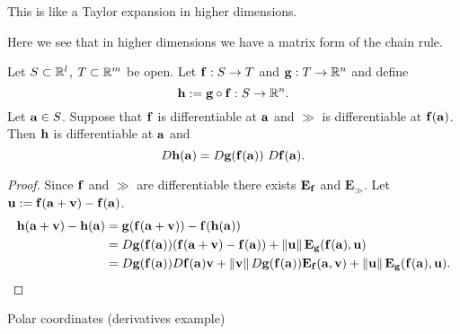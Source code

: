 This is like a Taylor expansion in higher dimensions.


Here we see that in higher dimensions we have a matrix form of the chain rule.

\begin{theorem}
    Let \(S\subset \bR^l\), \(T\subset \bR^m\) be open.
    Let \(\ff: S \to T\) and \(\gg:T \to \bR^n\) and define
    \[
        \hh := \gg \circ \ff : S \to \bR^n.
    \]
    Let  \(\aa\in S\). Suppose that \(\ff\) is differentiable at \(\aa\) and \(\gg\) is differentiable at \(\ff(\aa)\).
    Then \(\hh\) is differentiable at \(\aa\) and
    \[
        D\hh(\aa) = D\gg(\ff(\aa)) \ D\ff(\aa).
    \]
\end{theorem}

\vspace{-1em}

\begin{proof}
    Since \(\ff\) and \(\gg\) are differentiable there exists \(\mathbf{E}_{\ff}\) and \(\mathbf{E}_{\gg}\).
    Let \(\uu := \ff(\aa+\vv) - \ff(\aa) \).
    \[
        \begin{aligned}
            \hh(\aa+\vv) - \hh(\aa)
             & = \gg(\ff(\aa+\vv)) - \ff(\hh(\aa))                                                                                               \\
             & = D\gg(\ff(\aa))(\ff(\aa+\vv) - \ff(\aa) ) + \norm{\uu}\mathbf{E}_{\gg}(\ff(\aa),\uu)                                             \\
             & = D\gg(\ff(\aa))   D\ff(\aa) \vv + \norm{\vv}D\gg(\ff(\aa))\mathbf{E}_{\ff}(\aa, \vv) + \norm{\uu}\mathbf{E}_{\gg}(\ff(\aa),\uu).
        \end{aligned} \qedhere
    \]
\end{proof}




{Polar coordinates (derivatives example)}



